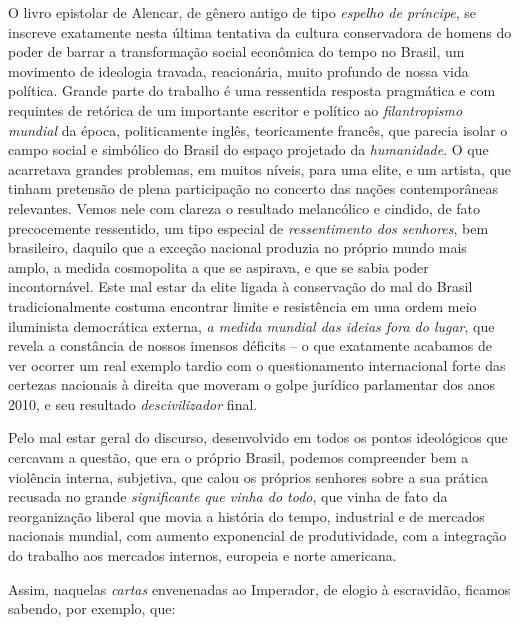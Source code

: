 O livro epistolar de Alencar, de gênero antigo de tipo \emph{espelho de
príncipe}, se inscreve exatamente nesta última tentativa da cultura
conservadora de homens do poder de barrar a transformação social
econômica do tempo no Brasil, um movimento de ideologia travada,
reacionária, muito profundo de nossa vida política. Grande parte do
trabalho é uma ressentida resposta pragmática e com requintes de
retórica de um importante escritor e político ao \emph{filantropismo
mundial} da época, politicamente inglês, teoricamente francês, que
parecia isolar o campo social e simbólico do Brasil do espaço projetado
da \emph{humanidade}. O que acarretava grandes problemas, em muitos
níveis, para uma elite, e um artista, que tinham pretensão de plena
participação no concerto das nações contemporâneas relevantes. Vemos
nele com clareza o resultado melancólico e cindido, de fato precocemente
ressentido, um tipo especial de \emph{ressentimento dos senhores}, bem
brasileiro, daquilo que a exceção nacional produzia no próprio mundo
mais amplo, a medida cosmopolita a que se aspirava, e que se sabia poder
incontornável. Este mal estar da elite ligada à conservação do mal do
Brasil tradicionalmente costuma encontrar limite e resistência em uma
ordem meio iluminista democrática externa, \emph{a medida mundial das
ideias fora do lugar}, que revela a constância de nossos imensos
déficits -- o que exatamente acabamos de ver ocorrer um real exemplo
tardio com o questionamento internacional forte das certezas nacionais à
direita que moveram o golpe jurídico parlamentar dos anos 2010, e seu
resultado \emph{descivilizador} final.

Pelo mal estar geral do discurso, desenvolvido em todos os pontos
ideológicos que cercavam a questão, que era o próprio Brasil, podemos
compreender bem a violência interna, subjetiva, que calou os próprios
senhores sobre a sua prática recusada no grande \emph{significante que
vinha do todo}, que vinha de fato da reorganização liberal que movia a
história do tempo, industrial e de mercados nacionais mundial, com
aumento exponencial de produtividade, com a integração do trabalho aos
mercados internos, europeia e norte americana.

Assim, naquelas \emph{cartas} envenenadas ao Imperador, de elogio à
escravidão, ficamos sabendo, por exemplo, que:

